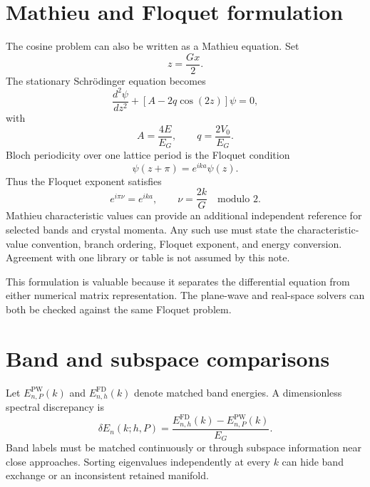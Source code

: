 \section*{Mathieu and Floquet formulation}

The cosine problem can also be written as a Mathieu equation. Set
\begin{equation}
    z=\frac{Gx}{2}.
\end{equation}
The stationary Schr\"odinger equation becomes
\begin{equation}
    \frac{d^2\psi}{dz^2}
    +
    \left[
        A-2q\cos(2z)
    \right]\psi
    =0,
\end{equation}
with
\begin{equation}
    A=\frac{4E}{E_G},
    \qquad
    q=\frac{2V_0}{E_G}.
\end{equation}
Bloch periodicity over one lattice period is the Floquet condition
\begin{equation}
    \psi(z+\pi)
    =
    e^{ika}\psi(z).
\end{equation}
Thus the Floquet exponent satisfies
\begin{equation}
    e^{i\pi\nu}=e^{ika},
    \qquad
    \nu=\frac{2k}{G}
    \quad\text{modulo }2.
\end{equation}
Mathieu characteristic values can provide an additional independent reference
for selected bands and crystal momenta. Any such use must state the
characteristic-value convention, branch ordering, Floquet exponent, and energy
conversion. Agreement with one library or table is not assumed by this note.

This formulation is valuable because it separates the differential equation
from either numerical matrix representation. The plane-wave and real-space
solvers can both be checked against the same Floquet problem.

\section*{Band and subspace comparisons}

Let $E_{n,P}^{\mathrm{PW}}(k)$ and $E_{n,h}^{\mathrm{FD}}(k)$ denote matched
band energies. A dimensionless spectral discrepancy is
\begin{equation}
    \delta E_n(k;h,P)
    =
    \frac{
        E_{n,h}^{\mathrm{FD}}(k)
        -
        E_{n,P}^{\mathrm{PW}}(k)
    }{E_G}.
\end{equation}
Band labels must be matched continuously or through subspace information near
close approaches. Sorting eigenvalues independently at every $k$ can hide band
exchange or an inconsistent retained manifold.

